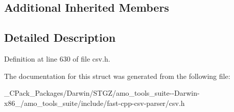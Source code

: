 \subsection*{Additional Inherited Members}


\subsection{Detailed Description}


Definition at line 630 of file csv.\+h.



The documentation for this struct was generated from the following file\+:\begin{DoxyCompactItemize}
\item 
\+\_\+\+C\+Pack\+\_\+\+Packages/\+Darwin/\+S\+T\+G\+Z/amo\+\_\+tools\+\_\+suite-\/-\/\+Darwin-\/x86\+\_/amo\+\_\+tools\+\_\+suite/include/fast-\/cpp-\/csv-\/parser/csv.\+h\end{DoxyCompactItemize}

